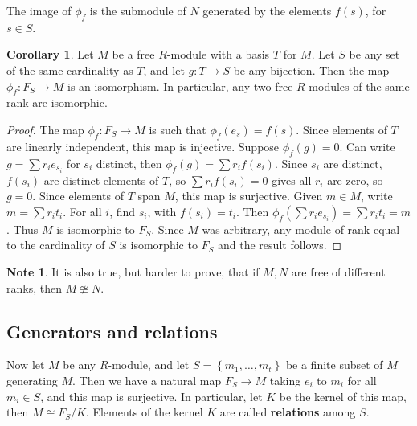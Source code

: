 \documentclass{article}
\newcommand{\rb}[1]{\left( #1 \right)}
\newcommand{\cb}[1]{\left\{ #1 \right\}}
\theoremstyle{definition}\newtheorem{definition}{Definition}[subsection]
\theoremstyle{definition}\newtheorem{remark}[definition]{Remark}
\theoremstyle{definition}\newtheorem*{example}{Example}
\theoremstyle{definition}\newtheorem*{note}{Note}
\newtheorem{corollary}[definition]{Corollary}
\begin{document}
The image of $ \phi_f $ is the submodule of $ N $ generated by the elements $ f\rb{s} $, for $ s \in S $.

\begin{corollary}
Let $ M $ be a free $ R $-module with a basis $ T $ for $ M $. Let $ S $ be any set of the same cardinality as $ T $, and let $ g : T \to S $ be any bijection. Then the map $ \phi_f : F_S \to M $ is an isomorphism. In particular, any two free $ R $-modules of the same rank are isomorphic.
\end{corollary}

\begin{proof}
The map $ \phi_f : F_S \to M $ is such that $ \phi_f\rb{e_s} = f\rb{s} $. Since elements of $ T $ are linearly independent, this map is injective. Suppose $ \phi_f\rb{g} = 0 $. Can write $ g = \sum r_ie_{s_i} $ for $ s_i $ distinct, then $ \phi_f\rb{g} = \sum r_if\rb{s_i} $. Since $ s_i $ are distinct, $ f\rb{s_i} $ are distinct elements of $ T $, so $ \sum r_if\rb{s_i} = 0 $ gives all $ r_i $ are zero, so $ g = 0 $. Since elements of $ T $ span $ M $, this map is surjective. Given $ m \in M $, write $ m = \sum r_it_i $. For all $ i $, find $ s_i $, with $ f\rb{s_i} = t_i $. Then $ \phi_f\rb{\sum r_ie_{s_i}} = \sum r_it_i = m $. Thus $ M $ is isomorphic to $ F_S $. Since $ M $ was arbitrary, any module of rank equal to the cardinality of $ S $ is isomorphic to $ F_S $ and the result follows.
\end{proof}

\begin{note}
It is also true, but harder to prove, that if $ M, N $ are free of different ranks, then $ M \ncong N $.
\end{note}

\subsection{Generators and relations}

Now let $ M $ be any $ R $-module, and let $ S = \cb{m_1, \dots, m_t} $ be a finite subset of $ M $ generating $ M $. Then we have a natural map $ F_S \to M $ taking $ e_i $ to $ m_i $ for all $ m_i \in S $, and this map is surjective. In particular, let $ K $ be the kernel of this map, then $ M \cong F_S / K $. Elements of the kernel $ K $ are called \textbf{relations} among $ S $.

\end{document}
